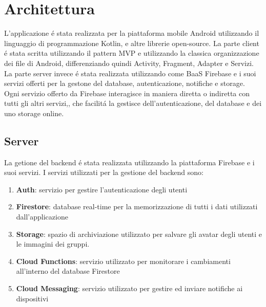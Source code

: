 
\chapter{Architettura}                %
\lhead[\fancyplain{}{\bfseries\thepage}]{\fancyplain{}{\bfseries\rightmark}}


L'applicazione \'e stata realizzata per la piattaforma mobile Android utilizzando il linguaggio di programmazione Kotlin, e altre librerie open-source. La parte client \'e stata scritta utilizzando il pattern MVP e utilizzando la classica organizzazione dei file di Android, differenziando quindi Activity, Fragment, Adapter e Servizi.\\
La parte server invece \'e stata realizzata utilizzando come BaaS Firebase e i suoi servizi offerti per la gestone del database, autenticazione, notifiche e storage.\\
Ogni servizio offerto da Firebase interagisce in maniera diretta o indiretta con tutti gli altri servizi,, che facilit\'a la gestisce dell'autenticazione, del database e dei uno storage online.\\

\newpage



\section{Server}                 %
La getione del backend \'e stata realizzata utilizzando la piattaforma Firebase e i suoi servizi.
I servizi utilizzati per la gestione del backend sono:
\begin{enumerate}
\item \textbf{Auth}: servizio per gestire l'autenticazione degli utenti
\item \textbf{Firestore}: database real-time per la memorizzazione di tutti i dati utilizzati dall'applicazione
\item \textbf{Storage}: spazio di archiviazione utilizzato per salvare gli avatar degli utenti e le immagini dei gruppi.
\item \textbf{Cloud Functions}: servizio utilizzato per monitorare i cambiamenti all'interno del database Firestore
\item \textbf{Cloud Messaging}: servizio utilizzato per gestire ed inviare notifiche ai dispositivi
\end{enumerate}


